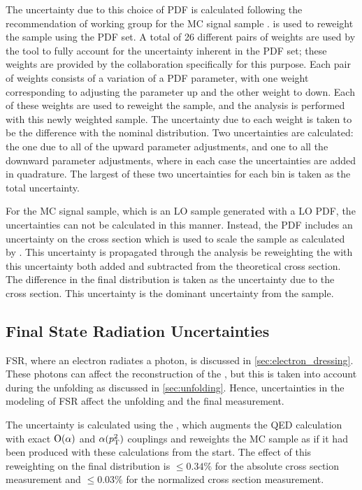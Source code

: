 The uncertainty due to this choice of PDF is calculated following the
recommendation of \PDFforLHC working group for the \POWHEG MC signal sample
\cite{botje_2011}. \PDFWeightProducer is used to reweight the \POWHEG sample
using the \CTten PDF set. A total of \num{26} different pairs of weights are
used by the tool to fully account for the uncertainty inherent in the PDF set;
these weights are provided by the \CTten collaboration specifically for this
purpose. Each pair of weights consists of a variation of a PDF parameter, with
one weight corresponding to adjusting the parameter up and the other weight to
down. Each of these weights are used to reweight the \POWHEG sample, and the
analysis is performed with this newly weighted sample. The uncertainty due to
each weight is taken to be the difference with the nominal \phistar
distribution. Two uncertainties are calculated: the one due to all of the
upward parameter adjustments, and one to all the downward parameter
adjustments, where in each case the uncertainties are added in quadrature. The
largest of these two uncertainties for each \phistar bin is taken as the total
uncertainty.

For the \MADGRAPH MC signal sample, which is an LO sample generated with a LO
PDF, the uncertainties can not be calculated in this manner. Instead, the PDF
includes an uncertainty on the cross section which is used to scale the sample
as calculated by \FEWZ. This uncertainty is propagated through the analysis be
reweighting the \MADGRAPH with this uncertainty both added and subtracted from
the theoretical cross section. The difference in the final \phistar
distribution is taken as the uncertainty due to the \FEWZ cross section. This
uncertainty is the dominant uncertainty from the \MADGRAPH sample.

\subsection{Final State Radiation Uncertainties}
\label{ssec:fsr_uncertainties}

FSR, where an electron radiates a photon, is discussed in
\cref{sec:electron_dressing}. These photons can affect the reconstruction
of the \Z, but this is taken into account during the unfolding as discussed in
\cref{sec:unfolding}. Hence, uncertainties in the modeling of FSR affect
the unfolding and the final measurement.

The uncertainty is calculated using the \FSRWeightProducer, which augments the
\PYTHIA QED calculation with exact $\operatorname{O}\!\left( \alpha \right)$ and $\alpha(p_{\mathrm{T}}^{2})$
couplings and reweights the MC sample as if it had been produced with these
calculations from the start. The effect of this reweighting on the final
\phistar distribution is $\le 0.34\%$ for the absolute cross section
measurement and $\le 0.03\%$ for the normalized cross section measurement.

